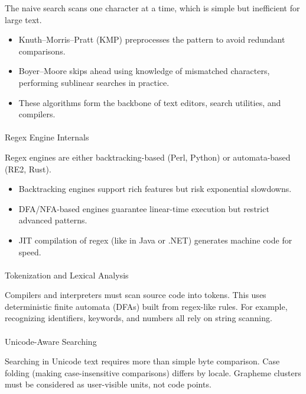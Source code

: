 \documentclass[
  letterpaper,
  DIV=11,
  numbers=noendperiod]{scrreprt}
\makeatletter
\let\oldparagraph\paragraph
\renewcommand{\paragraph}{
    \@ifstar
      \xxxParagraphStar
      \xxxParagraphNoStar
  }
\newcommand{\xxxParagraphStar}[1]{\oldparagraph*{#1}\mbox{}}
\newcommand{\xxxParagraphNoStar}[1]{\oldparagraph{#1}\mbox{}}
\providecommand{\tightlist}{%
  \setlength{\itemsep}{0pt}\setlength{\parskip}{0pt}}
\makeatother
\begin{document}
The naive search scans one character at a time, which is simple but
inefficient for large text.

\begin{itemize}
\tightlist
\item
  Knuth--Morris--Pratt (KMP) preprocesses the pattern to avoid redundant
  comparisons.
\item
  Boyer--Moore skips ahead using knowledge of mismatched characters,
  performing sublinear searches in practice.
\item
  These algorithms form the backbone of text editors, search utilities,
  and compilers.
\end{itemize}

\paragraph{Regex Engine Internals}\label{regex-engine-internals}

Regex engines are either backtracking-based (Perl, Python) or
automata-based (RE2, Rust).

\begin{itemize}
\tightlist
\item
  Backtracking engines support rich features but risk exponential
  slowdowns.
\item
  DFA/NFA-based engines guarantee linear-time execution but restrict
  advanced patterns.
\item
  JIT compilation of regex (like in Java or .NET) generates machine code
  for speed.
\end{itemize}

\paragraph{Tokenization and Lexical
Analysis}\label{tokenization-and-lexical-analysis}

Compilers and interpreters must scan source code into tokens. This uses
deterministic finite automata (DFAs) built from regex-like rules. For
example, recognizing identifiers, keywords, and numbers all rely on
string scanning.

\paragraph{Unicode-Aware Searching}\label{unicode-aware-searching}

Searching in Unicode text requires more than simple byte comparison.
Case folding (making case-insensitive comparisons) differs by locale.
Grapheme clusters must be considered as user-visible units, not code
points.
\end{document}
